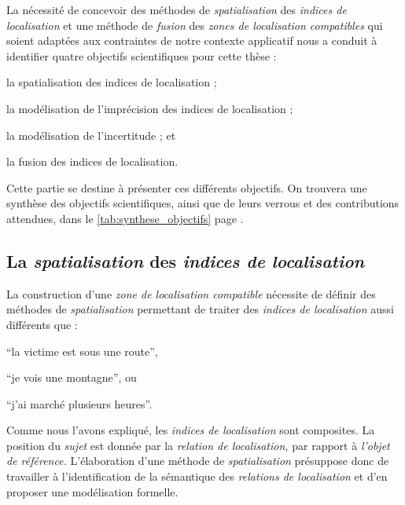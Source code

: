 La nécessité de concevoir des méthodes de \emph{spatialisation} des
\emph{indices de localisation} et une méthode de \emph{fusion} des
\emph{zones de localisation compatibles} qui soient adaptées aux
contraintes de notre contexte applicatif nous a conduit à identifier
quatre objectifs scientifiques pour cette thèse :
%
\begin{enumerate*}[label=(\arabic*)]
\item la spatialisation des indices de localisation ;
\item la modélisation de l'imprécision des indices de localisation ;
\item la modélisation de l'incertitude ; et
\item la fusion des indices de localisation.
\end{enumerate*}
%
Cette partie se destine à présenter ces différents objectifs.
On trouvera une synthèse des objectifs scientifiques, ainsi que de
leurs verrous et des contributions attendues, dans le
\autoref{tab:synthese_objectifs} page
\pageref{tab:synthese_objectifs}.

\subsection{La \emph{spatialisation} des \emph{indices de
    localisation}}
\label{subsec:2-1-1}

La construction d'une \emph{zone de localisation compatible} nécessite
de définir des méthodes de \emph{spatialisation} permettant de traiter
des \emph{indices de localisation} aussi différents que :
%
\begin{enumerate*}[label=(\alph*)]
\item \enquote{la victime est sous une route},
\item \enquote{je vois une montagne}, ou
\item \enquote{j'ai marché plusieurs heures}.
\end{enumerate*}
%
Comme nous l'avons expliqué, les \emph{indices de localisation} sont
composites. La position du \emph{sujet} est donnée par la
\emph{relation de localisation,} par rapport à \emph{l'objet de
  référence.} L'élaboration d'une méthode de \emph{spatialisation}
présuppose donc de travailler à l'identification de la sémantique des
\emph{relations de localisation} et d'en proposer une modélisation
formelle.

